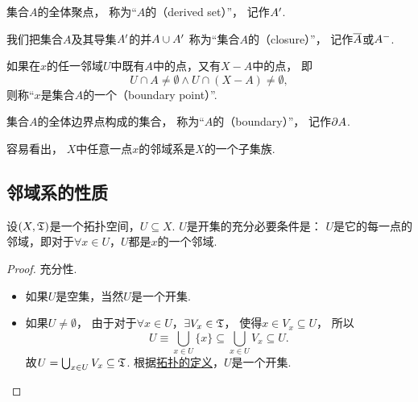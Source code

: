 \begin{definition}
集合\(A\)的全体聚点，
称为“\(A\)的（derived set）”，
记作\(A'\).

我们把集合\(A\)及其导集\(A'\)的并\(A \cup A'\)
称为“集合\(A\)的（closure）”，
记作\(\overline{A}\)或\(A^-\).

如果在\(x\)的任一邻域\(U\)中既有\(A\)中的点，又有\(X - A\)中的点，
即\begin{equation*}
	U \cap A \neq \emptyset
	\land
	U \cap (X-A) \neq \emptyset,
\end{equation*}
则称“\(x\)是集合\(A\)的一个（boundary point）”.

集合\(A\)的全体边界点构成的集合，
称为“\(A\)的（boundary）”，
记作\(\partial A\).
\end{definition}

容易看出，
\(X\)中任意一点\(x\)的邻域系是\(X\)的一个子集族.

\subsection{邻域系的性质}
\begin{theorem}\label{theorem:拓扑学.成为开集的充分必要条件1}
设\((X,{\mathfrak T})\)是一个拓扑空间，\(U \subseteq X\).
\(U\)是开集的充分必要条件是：
\(U\)是它的每一点的邻域，即对于\(\forall x \in U\)，\(U\)都是\(x\)的一个邻域.
\begin{proof}
充分性.
\begin{itemize}
	\item 如果\(U\)是空集，当然\(U\)是一个开集.

	\item 如果\(U\neq\emptyset\)，
	由于对于\(\forall x \in U\)，\(\exists V_x \in {\mathfrak T}\)，
	使得\(x \in V_x \subseteq U\)，
	所以\begin{equation*}
	U \equiv \bigcup_{x \in U} \{ x \}
	\subseteq \bigcup_{x \in U} V_x
	\subseteq U.
	\end{equation*}
	故\(U = \bigcup_{x \in U} V_x \subseteq {\mathfrak T}\).
	根据\hyperref[definition:拓扑学.开集公理定义的拓扑空间]{拓扑的定义}，\(U\)是一个开集.
	\qedhere
\end{itemize}
\end{proof}
\end{theorem}

